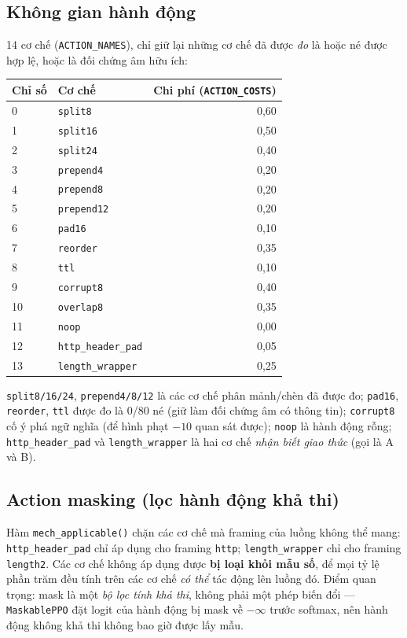 \documentclass[12pt,a4paper]{report}
\begin{document}
\subsection{Không gian hành động}
14 cơ chế (\texttt{ACTION\_NAMES}), chỉ giữ lại những cơ chế đã được \emph{đo} là
hoặc né được hợp lệ, hoặc là đối chứng âm hữu ích:

\begin{center}
\begin{tabular}{llr}
\toprule
Chỉ số & Cơ chế & Chi phí (\texttt{ACTION\_COSTS}) \\
\midrule
0 & \texttt{split8}  & 0{,}60 \\
1 & \texttt{split16} & 0{,}50 \\
2 & \texttt{split24} & 0{,}40 \\
3 & \texttt{prepend4}  & 0{,}20 \\
4 & \texttt{prepend8}  & 0{,}20 \\
5 & \texttt{prepend12} & 0{,}20 \\
6 & \texttt{pad16}   & 0{,}10 \\
7 & \texttt{reorder} & 0{,}35 \\
8 & \texttt{ttl}     & 0{,}10 \\
9 & \texttt{corrupt8} & 0{,}40 \\
10 & \texttt{overlap8} & 0{,}35 \\
11 & \texttt{noop}     & 0{,}00 \\
12 & \texttt{http\_header\_pad} & 0{,}05 \\
13 & \texttt{length\_wrapper}   & 0{,}25 \\
\bottomrule
\end{tabular}
\end{center}

\texttt{split8/16/24}, \texttt{prepend4/8/12} là các cơ chế phân mảnh/chèn đã được đo;
\texttt{pad16}, \texttt{reorder}, \texttt{ttl} được đo là 0/80 né (giữ làm đối chứng
âm có thông tin); \texttt{corrupt8} cố ý phá ngữ nghĩa (để hình phạt $-10$ quan sát
được); \texttt{noop} là hành động rỗng; \texttt{http\_header\_pad} và
\texttt{length\_wrapper} là hai cơ chế \emph{nhận biết giao thức} (gọi là A và B).

\subsection{Action masking (lọc hành động khả thi)}
Hàm \texttt{mech\_applicable()} chặn các cơ chế mà framing của luồng không thể mang:
\texttt{http\_header\_pad} chỉ áp dụng cho framing \texttt{http};
\texttt{length\_wrapper} chỉ cho framing \texttt{length2}. Các cơ chế không áp dụng
được \textbf{bị loại khỏi mẫu số}, để mọi tỷ lệ phần trăm đều tính trên các cơ chế
\emph{có thể} tác động lên luồng đó. Điểm quan trọng: mask là một \emph{bộ lọc tính
khả thi}, không phải một phép biến đổi — \texttt{MaskablePPO} đặt logit của hành động
bị mask về $-\infty$ trước softmax, nên hành động không khả thi không bao giờ được
lấy mẫu.
\end{document}
